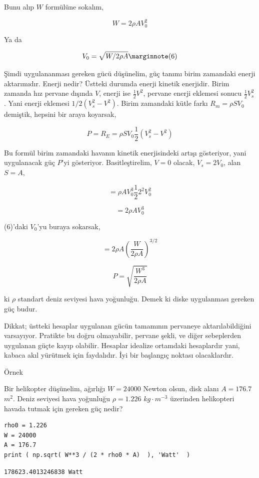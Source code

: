 \documentclass[12pt,fleqn]{article}\usepackage{../../common}
\begin{document}
Bunu alıp $W$ formülüne sokalım,

$$
W = 2 \rho A V_0^2
$$

Ya da

$$
V_0 = \sqrt{W / 2 \rho A} 
\mlabel{6}
$$

Şimdi uygulananması gereken gücü düşünelim, güç tanımı birim zamandaki
enerji aktarımıdır. Enerji nedir? Üstteki durumda enerji kinetik enerjidir.
Birim zamanda hız pervane dışında $V$, enerji ise $\frac{1}{2}V^2$, pervane
enerji eklemesi sonucu $\frac{1}{2} V_s^2$. Yani enerji eklemesi
$1/2(V_s^2 - V^2)$. Birim zamandaki kütle farkı $R_m = \rho S V_0$
demiştik, hepsini bir araya koyarsak,

$$
P = R_E = \rho S V_0 \frac{1}{2} (V_s^2 - V^2)
$$

Bu formül birim zamandaki havanın kinetik enerjisindeki artışı gösteriyor,
yani uygulanacak güç $P$'yi gösteriyor. Basitleştirelim, $V=0$ olacak,
$V_s = 2 V_0$, alan $S=A$,

$$
= \rho A V_0^3 \frac{1}{2} 2^2 V_0^2
$$

$$
= 2 \rho A V_0^3
$$

(6)'daki $V_0$'yu buraya sokarsak,

$$
= 2 \rho A \left( \frac{W}{ 2 \rho A} \right)^{3/2}
$$

$$
P = \sqrt{ \frac{W^3}{2 \rho A} }
$$

ki $\rho$ standart deniz seviyesi hava yoğunluğu. Demek ki diske
uygulanması gereken güç budur.

Dikkat; üstteki hesaplar uygulanan gücün tamamının pervaneye
aktarılabildiğini varsayıyor. Pratikte bu doğru olmayabilir, pervane şekli,
ve diğer sebeplerden uygulanan güçte kayıp olabilir. Hesaplar idealize
ortamdaki hesaplardır yani, kabaca akıl yürütmek için faydalıdır. İyi bir
başlangıç noktası olacaklardır.

Örnek

Bir helikopter düşünelim, ağırlığı $W = 24000$ Newton olsun, disk alanı
$A = 176.7$ $m^2$. Deniz seviyesi hava yoğunluğu $\rho = 1.226$
$kg \cdot m^{-3}$ üzerinden helikopteri havada tutmak için gereken güç
nedir?

\begin{verbatim}
rho0 = 1.226
W = 24000
A = 176.7
print ( np.sqrt( W**3 / (2 * rho0 * A)  ), 'Watt'  )  
\end{verbatim}

\begin{verbatim}
178623.4013246838 Watt
\end{verbatim}
\end{document}
